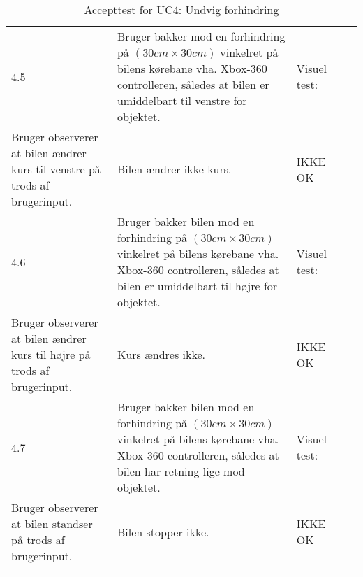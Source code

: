 \begin{longtable}{| l | >{\raggedright}X | >{\raggedright}X | >{\raggedright}X | >{\raggedright\arraybackslash}p{2.3cm} |}
	4.5 & Bruger bakker mod en forhindring på $(30cm \times 30cm)$ vinkelret på bilens kørebane vha. Xbox-360 controlleren, således at bilen er umiddelbart til venstre for objektet. 
		& Visuel test: \\ Bruger observerer at bilen ændrer kurs til venstre på trods af brugerinput. 
		& Bilen ændrer ikke kurs.
		& IKKE OK \\ \hline
	
	4.6 & Bruger bakker bilen mod en forhindring på $(30cm \times 30cm)$ vinkelret på bilens kørebane vha. Xbox-360 controlleren, således at bilen er umiddelbart til højre for objektet. 
		& Visuel test: \\ Bruger observerer at bilen ændrer kurs til højre på trods af brugerinput. 
		& Kurs ændres ikke.
		& IKKE OK\\ \hline
	
	4.7 & Bruger bakker bilen mod en forhindring på $(30cm \times 30cm)$ vinkelret på bilens kørebane vha. Xbox-360 controlleren, således at bilen har retning lige mod objektet. 
		& Visuel test: \\ Bruger observerer at bilen standser på trods af brugerinput. 
		& Bilen stopper ikke. 
		& IKKE OK\\\hline

\caption{Accepttest for UC4: Undvig forhindring}\label{tbl:acceptuc4}
\end{longtable}